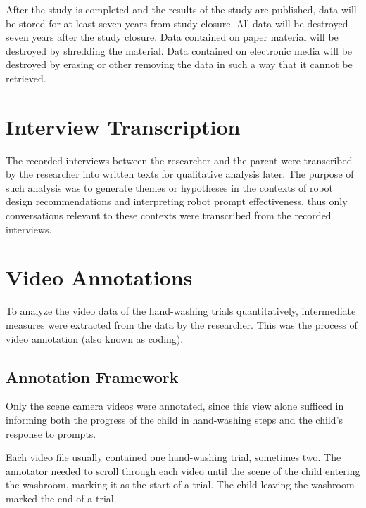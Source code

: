 \documentclass{ut-thesis}
\begin{document}
After the study is completed and the results of the study are published, data will be stored for at least seven years from study closure. All data will be destroyed seven years after the study closure. Data contained on paper material will be destroyed by shredding the material. Data contained on electronic media will be destroyed by erasing or other removing the data in such a way that it cannot be retrieved. 


\section{Interview Transcription}
The recorded interviews between the researcher and the parent were transcribed by the researcher into written texts for qualitative analysis later.  The purpose of such analysis was to generate themes or hypotheses in the contexts of robot design recommendations and interpreting robot prompt effectiveness, thus only conversations relevant to these contexts were transcribed from the recorded interviews.
\section{Video Annotations}
To analyze the video data of the hand-washing trials quantitatively, intermediate measures were extracted from the data by the researcher.  This was the process of video annotation (also known as coding).



\subsection{Annotation Framework}
\label{sec:AnnotationFramework}
Only the scene camera videos were annotated, since this view alone sufficed in informing both the progress of the child in hand-washing steps and the child's response to prompts.

Each video file usually contained one hand-washing trial, sometimes two.  The annotator needed to scroll through each video until the scene of the child entering the washroom, marking it as the start of a trial.  The child leaving the washroom marked the end of a trial.
\end{document}
